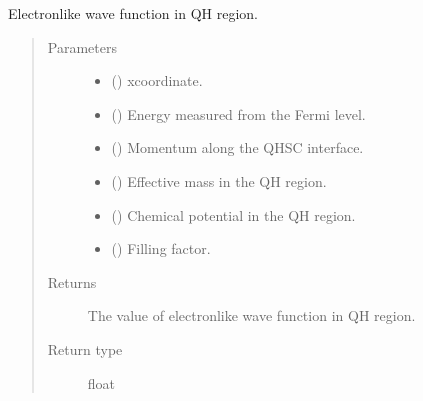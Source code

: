 \documentclass[letterpaper,10pt,english]{sphinxmanual}
\begin{document}

\begin{fulllineitems}
\label{\detokenize{modules:modules.functions.chi_p}}
\pysigstartsignatures
{}
\pysigstopsignatures
\sphinxAtStartPar
Electron\sphinxhyphen{}like wave function in QH region.
\begin{quote}\begin{description}
\item[{Parameters}] \leavevmode\begin{itemize}
\item {} 
\sphinxAtStartPar
{} () \textendash{} x\sphinxhyphen{}coordinate.

\item {} 
\sphinxAtStartPar
{} () \textendash{} Energy measured from the Fermi level.

\item {} 
\sphinxAtStartPar
{} () \textendash{} Momentum along the QH\sphinxhyphen{}SC interface.

\item {} 
\sphinxAtStartPar
{} () \textendash{} Effective mass in the QH region.

\item {} 
\sphinxAtStartPar
{} () \textendash{} Chemical potential in the QH region.

\item {} 
\sphinxAtStartPar
{} () \textendash{} Filling factor.

\end{itemize}

\item[{Returns}] \leavevmode
\sphinxAtStartPar
The value of electron\sphinxhyphen{}like wave function in QH region.

\item[{Return type}] \leavevmode
\sphinxAtStartPar
float

\end{description}\end{quote}

\end{fulllineitems}
\end{document}

